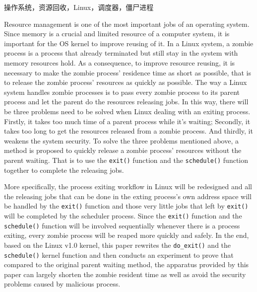 \documentclass{swfuthesism}
\begin{document}
\begin{keyword}
  操作系统，资源回收，Linux，调度器，僵尸进程
\end{keyword}

\begin{eabstract}
  Resource management is one of the most important jobs of an operating system. Since
  memory is a crucial and limited resource of a computer system, it is important for the OS
  kernel to improve reusing of it. In a Linux system, a zombie process is a process that
  already terminated but still stay in the system with memory resources hold. As a
  consequence, to improve resource reusing, it is necessary to make the zombie process'
  residence time as short as possible, that is to release the zombie process' resources as
  quickly as possible. The way a Linux system handles zombie processes is to pass every
  zombie process to its parent process and let the parent do the resources releasing
  jobs. In this way, there will be three problems need to be solved when Linux dealing
  with an exiting process. Firstly, it takes too much time of a parent process while it's
  waiting; Secondly, it takes too long to get the resources released from a zombie
  process. And thirdly, it weakens the system security. To solve the three problems
  mentioned above, a method is proposed to quickly release a zombie process' resources
  without the parent waiting. That is to use the \texttt{exit()} function and the
  \texttt{schedule()} function together to complete the releasing jobs. 
  
  More specifically, the process exiting workflow in Linux will be redesigned and all the
  releasing jobs that can be done in the exting process's own address space will be
  handled by the \texttt{exit()} function and those very little jobs that left by
  \texttt{exit()} will be completed by the scheduler process. Since the \texttt{exit()}
  function and the \texttt{schedule()} function will be involved sequentially whenever there is a
  process exiting, every zombie process will be reaped more quickly and safely. In the
  end, based on the Linux v1.0 kernel, this paper rewrites the \texttt{do\_exit()} and
  the \texttt{schedule()} kernel function and then conducts an experiment to prove that
  compared to the original parent waiting method, the apparatus provided by this paper can
  largely shorten the zombie resident time as well as avoid the security problems caused
  by malicious process.
  

\end{eabstract}
\end{document}
